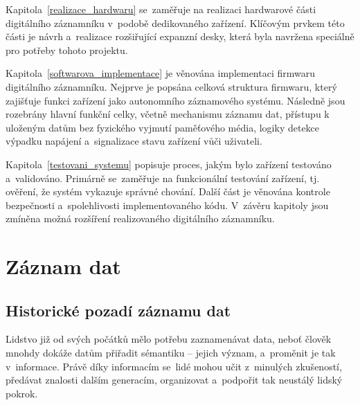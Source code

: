 Kapitola~\ref{realizace_hardwaru} se~zaměřuje na realizaci hardwarové části digitálního záznamníku v~podobě dedikovaného zařízení. Klíčovým prvkem této části je návrh a~realizace rozšiřující expanzní desky, která byla navržena speciálně pro potřeby tohoto projektu.


Kapitola~\ref{softwarova_implementace} je věnována implementaci firmwaru digitálního záznamníku. Nejprve je popsána celková struktura firmwaru, který zajišťuje funkci zařízení jako autonomního záznamového systému. Následně jsou rozebrány hlavní funkční celky, včetně mechanismu záznamu dat, přístupu k uloženým datům bez fyzického vyjmutí paměťového média, logiky detekce výpadku napájení a~signalizace stavu zařízení vůči uživateli.

Kapitola~\ref{testovani_systemu} popisuje proces, jakým bylo zařízení testováno a~validováno. Primárně se~zaměřuje na funkcionální testování zařízení, tj. ověření, že systém vykazuje správné chování. Další část je věnována kontrole bezpečnosti a~spolehlivosti implementovaného kódu. V~závěru kapitoly jsou zmíněna možná rozšíření realizovaného digitálního záznamníku.


\chapter{Záznam dat}
\label{zaznam_dat}

\section{Historické pozadí záznamu dat}
\label{pocatky}
Lidstvo již od svých počátků mělo potřebu zaznamenávat data, neboť člověk mnohdy dokáže datům přiřadit sémantiku -- jejich význam, a~proměnit je tak v~informace. Právě díky informacím se~lidé mohou učit z~minulých zkušeností, předávat znalosti dalším generacím, organizovat a~podpořit tak neustálý lidský pokrok.

